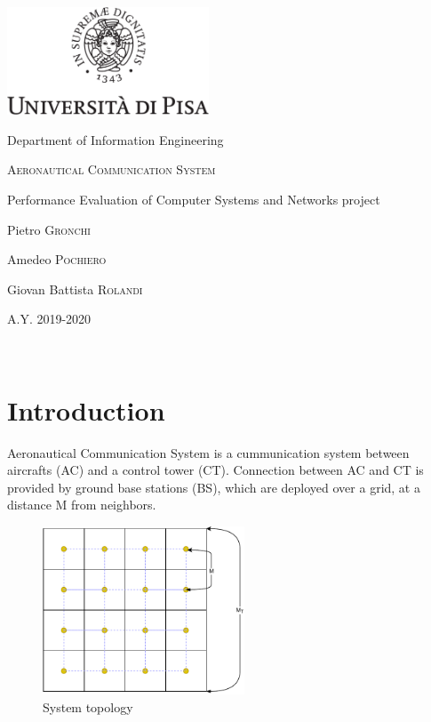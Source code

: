 \documentclass[a4paper,12pt]{article}
\newcommand{\projectname}{Aeronautical Communication System}
\begin{document}

{
  \begin{titlepage}
  	\centering
  	\includegraphics[width=6cm]{img/unipi.pdf}\par
    \vspace{1.5cm}
    {\Large Department of Information Engineering \par}
  	\vspace{1.5cm}
  	{\huge\textsc{\projectname{}}\par}
    \vspace{0.5cm}
    {\Large Performance Evaluation of Computer Systems and Networks project \par}
  	\vspace{2cm}
  	Pietro \textsc{Gronchi}\par
  	Amedeo \textsc{Pochiero}\par
    Giovan Battista \textsc{Rolandi}

  	\vfill

  	{\large A.Y. 2019-2020\par}
  \end{titlepage}
}


\clearpage
~
\clearpage
\tableofcontents
\clearpage
~
\clearpage
{}

\section{Introduction}
\projectname{} is a cummunication system between aircrafts (AC) and a control tower (CT).
Connection between AC and CT is provided by ground base stations (BS), which are deployed over a grid, at a distance M from neighbors.

\begin{figure}[H]
  \centering
  \includegraphics[width=6cm]{img/grid.pdf}
  \caption{System topology}
  \label{fig:grid}
\end{figure}
\end{document}
